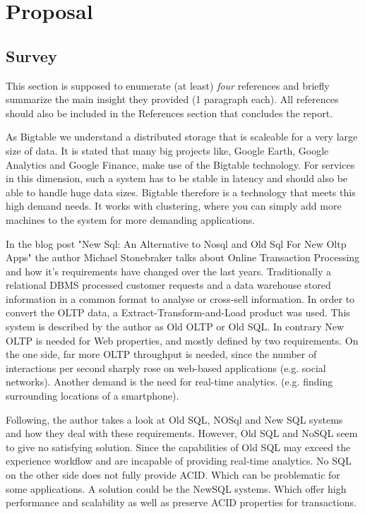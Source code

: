 \section{Proposal}

\subsection{Survey}
This section is supposed to enumerate (at least) \emph{four} references and
briefly summarize the main insight they provided (1 paragraph each). All
references should also be included in the References section that concludes the
report.

\begin{packed_enum}
\item
As Bigtable we understand a distributed storage that is scaleable for a very large size of data. It is stated that many big projects like, Google Earth, Google Analytics and Google Finance, make use of the Bigtable technology. For services in this dimension, such a system has to be stable in latency and should also be able to handle huge data sizes. Bigtable therefore is a technology that meets this high demand needs. It works with clustering, where you can simply add more machines to the system for more demanding applications. \cite{Chang2008}
\item 
In the blog post "New Sql: An Alternative to Nosql and Old Sql For New Oltp Apps" the author Michael Stonebraker talks about Online
Transaction Processing and how it's requirements have changed over the last years. Traditionally a relational DBMS processed customer requests and a data warehouse stored information in a common format to analyse or cross-sell information. In order to convert the OLTP data, a Extract-Transform-and-Load product was used. This system is described by the author as Old OLTP or Old SQL. In contrary New OLTP is needed for Web properties, and mostly defined by two requirements. On the one side, far more OLTP throughput is needed, since the number of interactions per second
sharply rose on web-based applications (e.g. social networks). Another demand is the need for real-time analytics. (e.g. finding surrounding locations of a smartphone).

Following, the author takes a look at Old SQL, NOSql and New SQL systems and how they deal with these requirements. However, Old SQL and NoSQL seem to give no satisfying solution. Since the capabilities of Old SQL may exceed the experience workflow and are incapable of providing real-time analytics.
No SQL on the other side does not fully provide ACID. Which can be problematic for some applications. A solution could be the NewSQL systems. Which offer high performance and scalability as well as preserve ACID properties for transactions. \cite{Stonebraker2011}


\end{packed_enum}
